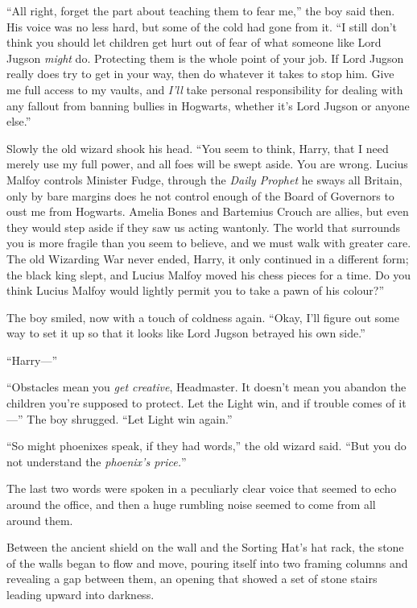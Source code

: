 “All right, forget the part about teaching them to fear me,” the boy said then. His voice was no less hard, but some of the cold had gone from it. “I still don’t think you should let children get hurt out of fear of what someone like Lord Jugson \emph{might} do. Protecting them is the whole point of your job. If Lord Jugson really does try to get in your way, then do whatever it takes to stop him. Give me full access to my vaults, and \emph{I’ll} take personal responsibility for dealing with any fallout from banning bullies in Hogwarts, whether it’s Lord Jugson or anyone else.”

Slowly the old wizard shook his head. “You seem to think, Harry, that I need merely use my full power, and all foes will be swept aside. You are wrong. Lucius Malfoy controls Minister Fudge, through the \emph{Daily Prophet} he sways all Britain, only by bare margins does he not control enough of the Board of Governors to oust me from Hogwarts. Amelia Bones and Bartemius Crouch are allies, but even they would step aside if they saw us acting wantonly. The world that surrounds you is more fragile than you seem to believe, and we must walk with greater care. The old Wizarding War never ended, Harry, it only continued in a different form; the black king slept, and Lucius Malfoy moved his chess pieces for a time. Do you think Lucius Malfoy would lightly permit you to take a pawn of his colour?”

The boy smiled, now with a touch of coldness again. “Okay, I’ll figure out some way to set it up so that it looks like Lord Jugson betrayed his own side.”

“Harry—”

“Obstacles mean you \emph{get creative}, Headmaster. It doesn’t mean you abandon the children you’re supposed to protect. Let the Light win, and if trouble comes of it—” The boy shrugged. “Let Light win again.”

“So might phoenixes speak, if they had words,” the old wizard said. “But you do not understand the \emph{phoenix’s price.}”

The last two words were spoken in a peculiarly clear voice that seemed to echo around the office, and then a huge rumbling noise seemed to come from all around them.

Between the ancient shield on the wall and the Sorting Hat’s hat rack, the stone of the walls began to flow and move, pouring itself into two framing columns and revealing a gap between them, an opening that showed a set of stone stairs leading upward into darkness.


